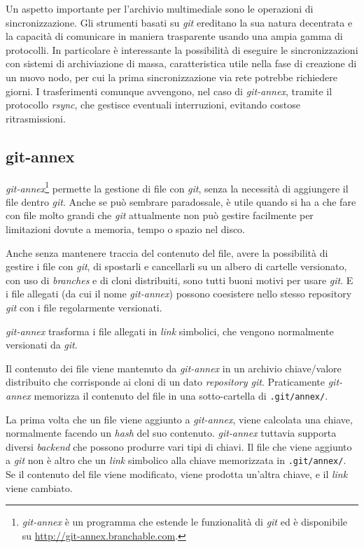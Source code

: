 Un aspetto importante per l'archivio multimediale sono le operazioni
di sincronizzazione. Gli strumenti basati su \emph{git} ereditano la
sua natura decentrata e la capacità di comunicare in maniera
trasparente usando una ampia gamma di protocolli. In particolare è
interessante la possibilità di eseguire le sincronizzazioni con
sistemi di archiviazione di massa, caratteristica utile nella fase di
creazione di un nuovo nodo, per cui la prima sincronizzazione via rete
potrebbe richiedere giorni. I trasferimenti comunque avvengono, nel
caso di \emph{git-annex}, tramite il protocollo \emph{rsync}, che
gestisce eventuali interruzioni, evitando costose ritrasmissioni. 

\subsection{git-annex}
\emph{git-annex}\footnote{\emph{git-annex} è un programma che estende
  le funzionalità di \emph{git} ed è disponibile su
  \url{http://git-annex.branchable.com}.} permette la gestione di file
con \emph{git}, senza la necessità di aggiungere il file dentro
\emph{git}. Anche se può sembrare paradossale, è utile quando si ha a
che fare con file molto grandi che \emph{git} attualmente non può
gestire facilmente per limitazioni dovute a memoria, tempo o spazio
nel disco.

Anche senza mantenere traccia del contenuto del file, avere la 
possibilità di gestire i file con \emph{git}, di spostarli e cancellarli su un
albero di cartelle versionato, con uso di \emph{branches} e di cloni
distribuiti, sono tutti buoni motivi per usare \emph{git}. E i file allegati
(da cui il nome \emph{git-annex}) possono coesistere nello stesso repository
\emph{git} con i file regolarmente versionati.

\emph{git-annex} trasforma i file allegati in \emph{link}
simbolici, che vengono normalmente versionati da \emph{git}. 

Il contenuto dei file viene mantenuto da \emph{git-annex} in un
archivio chiave/valore distribuito che corrisponde ai cloni di un
dato \emph{repository git}. Praticamente \emph{git-annex} memorizza il
contenuto del file in una sotto-cartella di \verb|.git/annex/|.

La prima volta che un file viene aggiunto a \emph{git-annex}, viene
calcolata una chiave, normalmente facendo un \emph{hash} del suo
contenuto. \emph{git-annex} tuttavia supporta diversi \emph{backend}
che possono produrre vari tipi di chiavi. Il file che viene aggiunto a
\emph{git} non è altro che un \emph{link} simbolico alla chiave
memorizzata in \verb|.git/annex/|. Se il contenuto del file viene
modificato, viene prodotta un'altra chiave, e il \emph{link} viene
cambiato.

